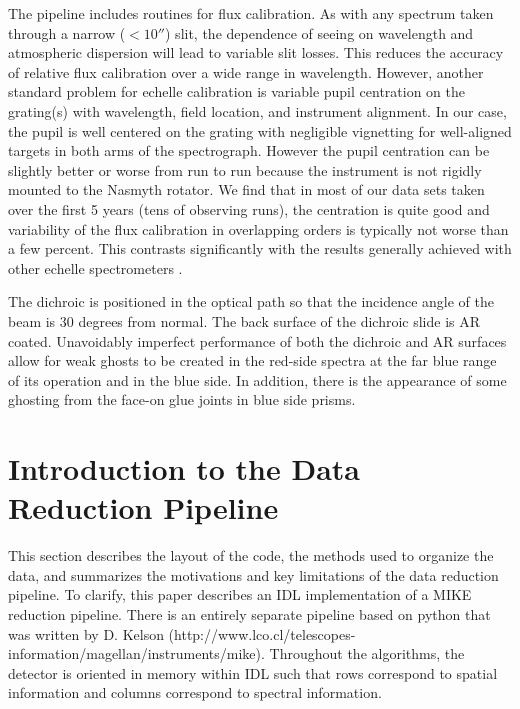 \documentclass[12pt,preprint]{aastex}
\begin{document}
The pipeline includes routines for flux calibration.  As with any
spectrum taken through a narrow ($<10''$) slit, the dependence of
seeing on wavelength and atmospheric dispersion
will lead to variable slit losses.  This reduces
the accuracy of relative flux calibration over a wide range in
wavelength. However, another standard problem for echelle calibration
is variable pupil centration on the grating(s) with wavelength, field
location, and instrument alignment.  In our case, the pupil is well
centered on the grating with negligible vignetting for well-aligned
targets in both arms of the spectrograph.  However the pupil
centration can be slightly better or worse from run to run because the
instrument is not rigidly mounted to the Nasmyth rotator.  We find
that in most of our data sets taken over the first 5 years (tens of
observing runs), the centration is quite good and variability of the
flux calibration in overlapping orders is typically not worse than a
few percent.
This contrasts significantly with the results generally achieved
with other echelle spectrometers \citep[e.g.\ Keck/HIRES][]{suzuki}.

The dichroic is positioned in the optical path so that the incidence
angle of the beam is 30 degrees from normal.  The back surface of the
dichroic slide is AR coated. Unavoidably imperfect performance of both
the dichroic and AR surfaces allow for weak ghosts to be created in
the red-side spectra at the far blue range of its operation and in the
blue side.  In addition, there is the appearance of some ghosting from 
the face-on glue joints in blue side prisms.


\section{Introduction to the Data Reduction Pipeline}
\label{sec:pipe}

This section describes the layout of the code, the methods
used to organize the data, and summarizes the motivations and 
key limitations of the data reduction pipeline.
To clarify, this paper describes an IDL implementation of
a MIKE reduction pipeline.  There is an entirely separate pipeline
based on python that was written by D. Kelson 
(http://www.lco.cl/telescopes-information/magellan/instruments/mike).
Throughout the algorithms, the detector is oriented in memory 
within IDL such that rows correspond to spatial information and columns
correspond to spectral information.
\end{document}
